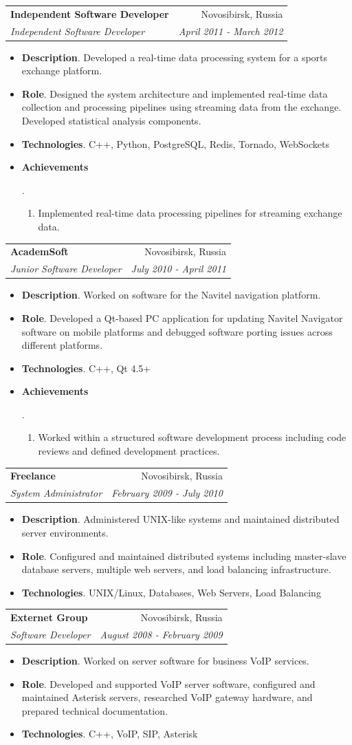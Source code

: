 \documentclass[letterpaper,11pt]{article}
\makeatletter
\newcommand{\resumeItem}[2]{
  \item\small{
    \textbf{#1}{. #2 \vspace{-2pt}}
  }
}
\newcommand{\resumeSubheading}[4]{
  \vspace{-1pt}\item
    \begin{tabular*}{0.97\textwidth}{l@{\extracolsep{\fill}}r}
      \textbf{#1} & #2 \\
      \textit{\small#3} & \textit{\small #4} \\
    \end{tabular*}\vspace{-5pt}
}
\newcommand{\resumeItemListStart}{\begin{itemize}}
\newcommand{\resumeItemListEnd}{\end{itemize}\vspace{-5pt}}
\makeatother
\begin{document}
\resumeSubheading
      {Independent Software Developer}{Novosibirsk, Russia}
      {Independent Software Developer}{April 2011 - March 2012}
      \resumeItemListStart
        \resumeItem{Description}
          {Developed a real-time data processing system for a sports exchange platform.}
        \resumeItem{Role}
          {Designed the system architecture and implemented real-time data collection and processing pipelines using streaming data from the exchange. Developed statistical analysis components.}
        \resumeItem{Technologies}
          {C++, Python, PostgreSQL, Redis, Tornado, WebSockets}
        \resumeItem{Achievements}
          {
            \begin{enumerate}
              \item Implemented real-time data processing pipelines for streaming exchange data.
            \end{enumerate}
          }
      \resumeItemListEnd

\resumeSubheading
      {AcademSoft}{Novosibirsk, Russia}
      {Junior Software Developer}{July 2010 - April 2011}
      \resumeItemListStart
        \resumeItem{Description}
          {Worked on software for the Navitel navigation platform.}
        \resumeItem{Role}
          {Developed a Qt-based PC application for updating Navitel Navigator software on mobile platforms and debugged software porting issues across different platforms.}
        \resumeItem{Technologies}
          {C++, Qt 4.5+}
        \resumeItem{Achievements}
          {
            \begin{enumerate}
              \item Worked within a structured software development process including code reviews and defined development practices.
            \end{enumerate}
          }
      \resumeItemListEnd

\resumeSubheading
      {Freelance}{Novosibirsk, Russia}
      {System Administrator}{February 2009 - July 2010}
      \resumeItemListStart
        \resumeItem{Description}
          {Administered UNIX-like systems and maintained distributed server environments.}
        \resumeItem{Role}
          {Configured and maintained distributed systems including master-slave database servers, multiple web servers, and load balancing infrastructure.}
        \resumeItem{Technologies}
          {UNIX/Linux, Databases, Web Servers, Load Balancing}
      \resumeItemListEnd

\resumeSubheading
      {Externet Group}{Novosibirsk, Russia}
      {Software Developer}{August 2008 - February 2009}
      \resumeItemListStart
        \resumeItem{Description}
          {Worked on server software for business VoIP services.}
        \resumeItem{Role}
          {Developed and supported VoIP server software, configured and maintained Asterisk servers, researched VoIP gateway hardware, and prepared technical documentation.}
        \resumeItem{Technologies}
          {C++, VoIP, SIP, Asterisk}
      \resumeItemListEnd
\end{document}
